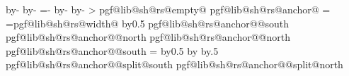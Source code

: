 {{{                \advance\pgf@x by-\innerxsep\relax%
                \advance\pgf@x by-\outerxsep\relax%
                \pgf@y=-\pgf@lib@sh@rs@yoffset\relax%
                \advance\pgf@y by-\innerysep\relax%
                \advance\pgf@y by-\outerysep\relax%
            }%
            \addtosavedmacro\southwest%
            \pgfextract@process{}%
            \addtosavedmacro\centerpoint%
            \pgfmathloop%
                \ifnum\pgfmathcounter>\parts%
                \else%
                    \pgf@lib@sh@getalpha\pgf@lib@sh@rs@number{\pgfmathcounter}%
                    \expandafter\ifx\csname pgf@lib@sh@rs@empty@\pgf@lib@sh@rs@number\endcsname\pgfutil@empty%
                    \else%
                        \csname pgf@lib@sh@rs@anchor@\pgf@lib@sh@rs@number\endcsname%
                        \pgf@xa=\pgf@x%
                        \pgf@xb=\csname pgf@lib@sh@rs@width@\pgf@lib@sh@rs@number\endcsname\relax%
                        \advance\pgf@xa by0.5\pgf@xb%
                        \expandafter\pgfextract@process\csname pgf@lib@sh@rs@anchor@\pgf@lib@sh@rs@number @south\endcsname{%
                            \southwest%
                            \pgf@x=\pgf@xa%
                        }%
                        \expandafter\pgfextract@process\csname pgf@lib@sh@rs@anchor@\pgf@lib@sh@rs@number @north\endcsname{%
                            \northeast%
                            \pgf@x=\pgf@xa%
                        }%
                        \expandafter\addtosavedmacro\csname pgf@lib@sh@rs@anchor@\pgf@lib@sh@rs@number @north\endcsname%
                        \expandafter\addtosavedmacro\csname pgf@lib@sh@rs@anchor@\pgf@lib@sh@rs@number @south\endcsname%
                        \ifnum\pgfmathcounter=\parts%
                        \else%
                            \advance\pgf@xa by0.5\pgf@xb%
                            \advance\pgf@xa by\innerxsep\relax%
                            \advance\pgf@xa by.5\pgflinewidth%
                            \expandafter\pgfextract@process\csname pgf@lib@sh@rs@anchor@\pgf@lib@sh@rs@number @split@south\endcsname{%
                                \southwest%
                                \pgf@x=\pgf@xa%
                            }%
                            \expandafter\pgfextract@process\csname pgf@lib@sh@rs@anchor@\pgf@lib@sh@rs@number @split@north\endcsname{%
                                \northeast%
}}}
